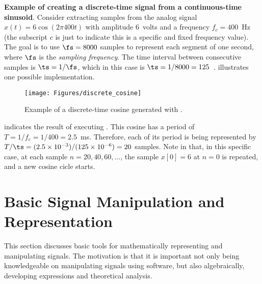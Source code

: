 \bExample \textbf{Example of creating a discrete-time signal from a continuous-time sinusoid}.
Consider extracting samples from the analog signal $x(t)=6\cos(2\pi 400 t)$ with amplitude 6~volts and a frequency $f_c=400$~Hz (the subscript $c$ is just to indicate this is a specific and fixed frequency value).
The goal is to use $\fs = 8000$ samples to represent each segment of one second, where $\fs$ is the \emph{sampling frequency}. The time interval between consecutive samples is $\ts=1/\fs$, which in this case is $\ts = 1/8000 = 125$~\mus.  illustrates one possible implementation.


\begin{figure}
	\centering
		\texttt{[image: Figures/discrete\_cosine]}		
	\caption{Example of a discrete-time cosine generated with .\label{fig:discrete_cosine}}
\end{figure}

 indicates the result of executing . This cosine has a period of $T=1/f_c = 1/400=2.5$~ms. Therefore, each of its period is being represented by $T / \ts = (2.5 \times 10^{-3}) / (125 \times 10^{-6}) = 20$ samples. Note in  that, in this specific case, at each sample $n = 20, 40, 60, \ldots$, the sample $x[0]=6$ at $n=0$ is repeated, and a new cosine cicle starts.
\eExample

\section{Basic Signal Manipulation and Representation}

This section discusses basic tools for mathematically representing and manipulating signals. The motivation is that it is important not only being knowledgeable on manipulating signals using software, but also algebraically, developing expressions and theoretical analysis. 

